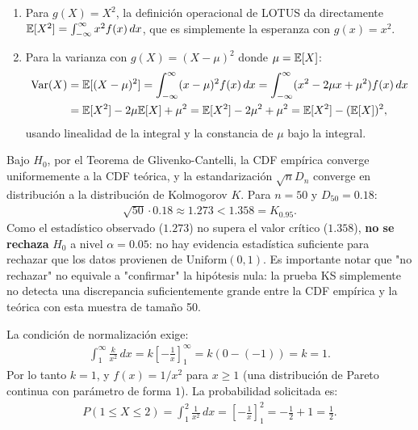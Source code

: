 \begin{solproblema}[prob:19f62fd]
	\begin{enumerate}
		\item Para $g(X)=X^2$, la definición operacional de LOTUS da directamente $\mathbb{E}[X^2]=\int_{-\infty}^{\infty}x^2f(x)\,dx$, que es simplemente la esperanza con $g(x)=x^2$.
		\item Para la varianza con $g(X)=(X-\mu)^2$ donde $\mu=\mathbb{E}[X]$:
		\begin{align*}
			\operatorname{Var}(X) &= \mathbb{E}[(X-\mu)^2] = \int_{-\infty}^{\infty}(x-\mu)^2f(x)\,dx = \int_{-\infty}^{\infty}(x^2-2\mu x+\mu^2)f(x)\,dx \\
			&= \mathbb{E}[X^2]-2\mu\mathbb{E}[X]+\mu^2 = \mathbb{E}[X^2]-2\mu^2+\mu^2 = \mathbb{E}[X^2]-(\mathbb{E}[X])^2,
		\end{align*}
		usando linealidad de la integral y la constancia de $\mu$ bajo la integral.
	\end{enumerate}
\end{solproblema}

\begin{solproblema}[prob:8ec7e10]
	Bajo $H_0$, por el Teorema de Glivenko-Cantelli, la CDF empírica converge uniformemente a la CDF teórica, y la estandarización $\sqrt{n}D_n$ converge en distribución a la distribución de Kolmogorov $K$. Para $n=50$ y $D_{50}=0.18$:
	\begin{align*}
		\sqrt{50}\cdot0.18 \approx 1.273 < 1.358 = K_{0.95}.
	\end{align*}
	Como el estadístico observado ($1.273$) no supera el valor crítico ($1.358$), \textbf{no se rechaza} $H_0$ a nivel $\alpha=0.05$: no hay evidencia estadística suficiente para rechazar que los datos provienen de $\text{Uniform}(0,1)$. Es importante notar que "no rechazar" no equivale a "confirmar" la hipótesis nula: la prueba KS simplemente no detecta una discrepancia suficientemente grande entre la CDF empírica y la teórica con esta muestra de tamaño 50.
\end{solproblema}

\begin{solproblema}[prob:0d490fc]
	La condición de normalización exige:
	\begin{align*}
		\int_{1}^{\infty} \frac{k}{x^2}\,dx = k\left[-\frac{1}{x}\right]_{1}^{\infty} = k(0-(-1)) = k = 1.
	\end{align*}
	Por lo tanto $k=1$, y $f(x) = 1/x^2$ para $x\ge1$ (una distribución de Pareto continua con parámetro de forma $1$). La probabilidad solicitada es:
	\begin{align*}
		P(1 \le X \le 2) = \int_{1}^{2} \frac{1}{x^2}\,dx = \left[-\frac{1}{x}\right]_{1}^{2} = -\frac{1}{2}+1 = \frac{1}{2}.
	\end{align*}
\end{solproblema}

